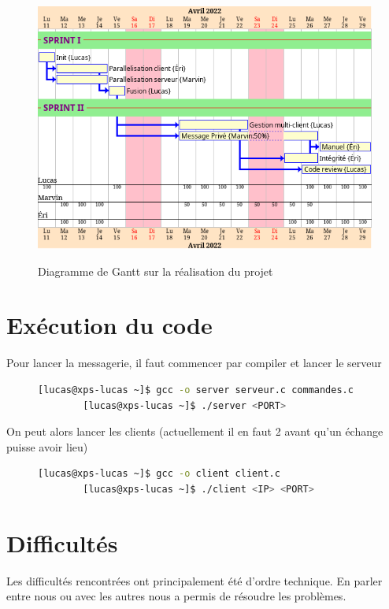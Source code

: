 \documentclass[a4paper,12pt]{article}
\begin{document}
\begin{figure}[h]
	\centering
	\hrulefill\\
	\vspace{0.4cm}
	\includegraphics[width=\linewidth]{gantt.png}\\
	\caption{Diagramme de Gantt sur la réalisation du projet}
	\label{fig:gantt}
	\hrulefill
\end{figure}
\pagebreak
\section{Exécution du code}
Pour lancer la messagerie, il faut commencer par compiler et lancer le serveur
\begin{figure}[h]
	\centering
	\vspace{-0.1cm}
	\begin{lstlisting}[language=bash, gobble=4]
		[lucas@xps-lucas ~]$ gcc -o server serveur.c commandes.c
		[lucas@xps-lucas ~]$ ./server <PORT>
	\end{lstlisting}
\end{figure}

\noindent On peut alors lancer les clients (actuellement il en faut 2 avant qu'un échange puisse avoir lieu)
\begin{figure}[h]
	\centering
	\vspace{-0.2cm}
	\begin{lstlisting}[language=bash, gobble=4]
		[lucas@xps-lucas ~]$ gcc -o client client.c
		[lucas@xps-lucas ~]$ ./client <IP> <PORT>
	\end{lstlisting}
\end{figure}
\section{Difficultés}
Les difficultés rencontrées ont principalement été d'ordre technique. En parler entre nous ou avec les autres nous a permis de résoudre les problèmes.
\end{document}
